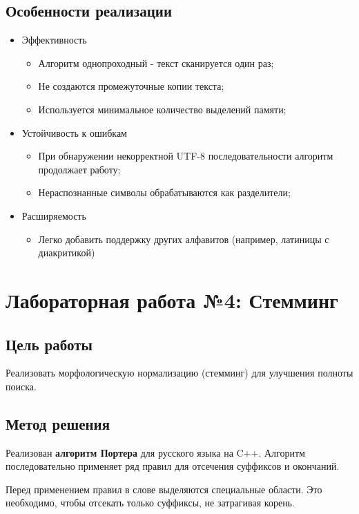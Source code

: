\documentclass[a4paper,12pt]{article}
\begin{document}
\subsection{Особенности реализации}
\begin{itemize}
    \item Эффективность
    \begin{itemize}
        \item Алгоритм однопроходный - текст сканируется один раз;
        \item Не создаются промежуточные копии текста;
        \item Используется минимальное количество выделений памяти;
    \end{itemize}
    \item Устойчивость к ошибкам
    \begin{itemize}
        \item При обнаружении некорректной UTF-8 последовательности алгоритм продолжает работу;
        \item Нераспознанные символы обрабатываются как разделители;
    \end{itemize}
    \item Расширяемость
    \begin{itemize}
        \item Легко добавить поддержку других алфавитов (например, латиницы с диакритикой)
    \end{itemize}
\end{itemize}

\section{Лабораторная работа №4: Стемминг}

\subsection{Цель работы}
Реализовать морфологическую нормализацию (стемминг) для улучшения полноты поиска. 

\subsection{Метод решения}
Реализован \textbf{алгоритм Портера} для русского языка на C++. Алгоритм последовательно применяет ряд правил для отсечения суффиксов и окончаний.

Перед применением правил в слове выделяются специальные области. Это необходимо, чтобы отсекать только суффиксы, не затрагивая корень.
\end{document}
